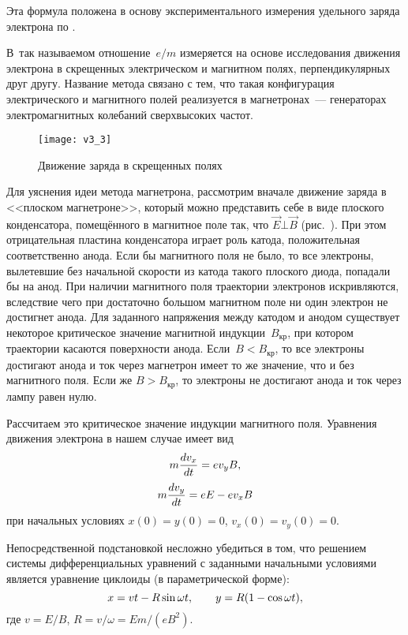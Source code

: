 Эта формула положена в основу экспериментального измерения удельного заряда
электрона по .\label{magnetic focusing}


В~так называемом {} отношение~$e/m$ измеряется на
основе исследования движения электрона в скрещенных электрическом и магнитном
полях, перпендикулярных друг другу. Название метода связано с тем, что такая
конфигурация электрического и магнитного полей реализуется в магнетронах~---
генераторах электромагнитных колебаний
сверхвысоких частот.

\begin{figure}[h!]
	\texttt{[image: v3\_3]}
	\caption{Движение заряда в скрещенных полях}
\end{figure}

Для уяснения идеи метода магнетрона, рассмотрим вначале движение заряда в
<<плоском магнетроне>>, который можно
представить себе в виде плоского конденсатора, помещённого в магнитное поле так,
что $\vec{E}\bot\vec{B}$ (рис.~). При этом отрицательная
пластина конденсатора играет роль катода, положительная соответственно анода.
Если бы магнитного поля не было, то все электроны, вылетевшие без начальной
скорости из катода такого плоского диода, попадали бы на анод. При наличии
магнитного поля траектории электронов искривляются, вследствие чего при
достаточно большом магнитном поле ни один электрон не достигнет анода. Для
заданного напряжения между катодом и анодом существует некоторое критическое
значение магнитной индукции~$B_\text{кр}$, при котором траектории касаются
поверхности анода. Если~$B<B_\text{кр}$, то все электроны достигают анода и ток
через магнетрон имеет то же значение, что и без магнитного поля. Если же
$B>B_\text{кр}$, то электроны не достигают анода и ток через лампу равен нулю.

Рассчитаем это критическое значение индукции магнитного поля. Уравнения движения
электрона в нашем случае имеет вид
\begin{equation}
	\eqmark{3.9}
	m\frac{dv_x}{dt}=ev_y B,
\end{equation}
\begin{equation}
	\eqmark{3.10}
	m\frac{dv_y}{dt}=eE-ev_x B
\end{equation}
при начальных условиях $x(0)=y(0)=0$, $v_x(0)=v_y(0)=0$.

Непосредственной подстановкой несложно убедиться в том, что решением системы
дифференциальных уравнений с заданными
начальными условиями является уравнение циклоиды (в параметрической форме):
\begin{equation}
	\eqmark{3.11}
	x = vt - R\sin\omega t,\qquad y = R(1-\cos\omega t),
\end{equation}
где $ v=E/B$, $R=v/\omega=Em/(eB^2)$.

